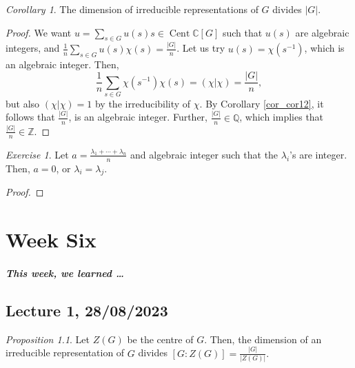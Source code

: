\documentclass[a4paper]{report}
\theoremstyle{definition}
\theoremstyle{remark}
\theoremstyle{proposition}
\newtheorem{proposition}{Proposition}
\theoremstyle{conjecture}
\theoremstyle{lemma}
\theoremstyle{corollary}
\newtheorem{corollary}{Corollary}
\theoremstyle{exercise}
\newtheorem{exercise}{Exercise}
\theoremstyle{example}
\newcommand{\C}{\mathbb{C}}
\newcommand{\on}{\operatorname}
\begin{document}
\begin{corollary}\label{cor_cor13}
    The dimension of irreducible representations of $G$ divides $\vert G\vert$.
\end{corollary}

\begin{proof}
    We want $u = \sum_{s\in G}u(s) s\in\on{Cent}\C[G]$ such that 
    $u(s)$ are algebraic integers, and 
    $\frac{1}{n}\sum_{s \in G}u(s)\chi(s) = \frac{\vert G\vert}{n}$.
    Let us try $u(s) = \chi(s^{-1})$, which is an algebraic integer.
    Then,$$\frac{1}{n}\sum_{s \in G} \chi(s^{-1})\chi(s) = (\chi\vert\chi) = \frac{\vert G\vert}{n},$$
    but also $(\chi\vert\chi) = 1$ by the irreducibility of $\chi$.
    By Corollary \ref{cor_cor12}, it follows that 
    $\frac{\vert G\vert}{n}$, is an algebraic integer. Further, 
    $\frac{\vert G\vert}{n} \in \mathbb{Q}$, which implies that 
    $\frac{\vert G\vert}{n} \in \mathbb{Z}$.

\end{proof}

\begin{exercise}
    Let $a = \frac{\lambda_1+\cdots+\lambda_n}{n}$ and algebraic 
    integer such that the $\lambda_i$'s are integer. Then,
    $a = 0$, or $\lambda_i = \lambda_j$.
\end{exercise}

\begin{proof}

\end{proof}

\chapter{Week Six}

\paragraph{This week, we learned \ldots}

\section{Lecture 1, 28/08/2023}

\begin{proposition}
    Let $Z(G)$ be the centre of $G$. Then, the dimension of an 
    irreducible representation of $G$ divides $[G:Z(G)] = \frac{\vert G\vert}{\vert Z(G)\vert}.$
\end{proposition}
\end{document}
